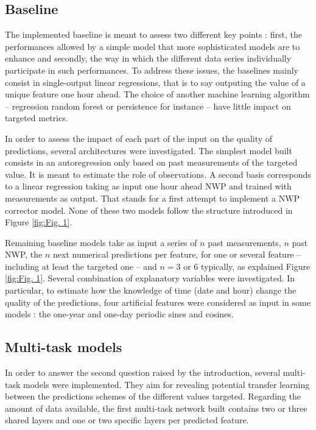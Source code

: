 \documentclass{article}
\newcommand{\saut}{\vspace{10px}}
\begin{document}
\subsection*{Baseline}

The implemented baseline is meant to assess two different key points : first, the performances allowed by a simple
model that more sophisticated models are to enhance and secondly, the way in which the different data
series individually participate in such performances. To address these issues, the baselines mainly consist in single-output
linear regressions, that is to say outputing the value of a unique feature one hour ahead.
The choice of another machine learning algorithm -- regression random forest or persistence for instance -- have little
impact on targeted metrics.

\saut

In order to assess the impact of each part of the input on the quality of predictions, several architectures were investigated.
The simplest model built consists in an autoregression only based on past measurements of the targeted value.
It is meant to estimate the role of observations. A second basis corresponds to a linear regression taking as input
one hour ahead NWP and trained with measurements as output. That stands for a first attempt to implement a
NWP corrector model. None of these two models follow the structure introduced in Figure \ref{fig:Fig. 1}.

\saut

Remaining baseline models take as input a series of $n$ past measurements, $n$ past NWP, the $n$ next
numerical predictions per feature, for one or several feature -- including at least the targeted one -- and $n = 3$ or
$6$ typically, as explained Figure \ref{fig:Fig. 1}. Several combination of explanatory variables were investigated.
In particular, to estimate how the knowledge of time (date and hour) change the quality of the predictions,
four artificial features were considered as input in some models : the one-year and one-day periodic sines and cosines.

\subsection*{Multi-task models}

In order to answer the second question raised by the introduction, several multi-task models were implemented.
They aim for revealing potential transfer learning between the predictions schemes of the different values targeted.
Regarding the amount of data available, the first multi-task network built contains two or three shared layers and
one or two specific layers per predicted feature.
\end{document}
